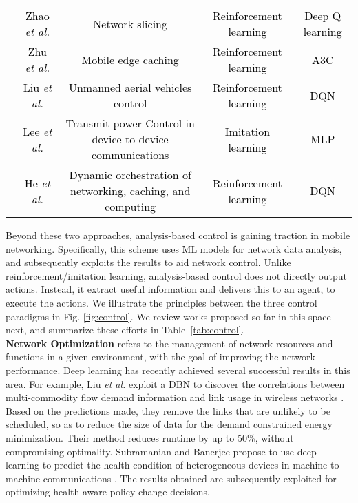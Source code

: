 \documentclass[journal,comsoc,letter]{IEEEtran}
\newcommand{\rev}[1]{\textcolor{black}{#1}}
\begin{document}
\begin{table*}[h!]
\begin{tabular}{|c|C{3CM}|C{5CM}|c|C{3CM}|}
                                      & \rev{Zhao \emph{et al.} \cite{zhao2018deep}}                      & \rev{Network slicing}                                & \rev{Reinforcement learning} & \rev{Deep Q learning} \\  
                                      & \rev{Zhu \emph{et al.} \cite{zhu2018deep}}                      & \rev{Mobile edge caching}                                & \rev{Reinforcement learning} & \rev{A3C} \\  
                                      & \rev{Liu \emph{et al.} \cite{liu2018energy}}                      & \rev{Unmanned aerial vehicles control}                                & \rev{Reinforcement learning} & \rev{DQN} \\  
                                      & \rev{Lee \emph{et al.} \cite{lee2018deep}}                      & \rev{Transmit power Control in device-to-device communications}                                & \rev{Imitation learning} & \rev{MLP} \\  
                                      & \rev{He \emph{et al.} \cite{he2017software}}                      & \rev{Dynamic orchestration of networking, caching, and computing }                                & \rev{Reinforcement learning} & \rev{DQN} \\\hline
\end{tabular}
\end{table*}

Beyond these two approaches, analysis-based control is gaining traction in mobile networking. Specifically, this scheme uses ML models for network data analysis, and subsequently exploits the results to aid network control. Unlike reinforcement/imitation learning, analysis-based control does not directly output actions. Instead, it extract useful information and delivers this to an agent, to execute the actions. We illustrate the principles between the three control paradigms in Fig. \ref{fig:control}. We review works proposed so far in this space next, and summarize these efforts in Table~\ref{tab:control}.\\


\noindent\textbf{Network Optimization} refers to the management of network resources and functions in a given environment, with the goal of improving the network performance. Deep learning has recently achieved several successful results in this area. For example,  Liu \emph{et al.} exploit a DBN to discover the correlations between multi-commodity flow demand information and link usage in wireless networks \cite{liu2017deep222}. Based on the predictions made, they remove the links that are unlikely to be scheduled, so as to reduce the size of data for the demand constrained energy minimization. Their method reduces runtime by up to 50\%, without compromising optimality. Subramanian and Banerjee propose to use deep learning to predict the health condition of heterogeneous devices in machine to machine communications \cite{subramanian2016poster}. The results obtained are subsequently exploited for optimizing health aware policy change decisions. 
\end{document}
